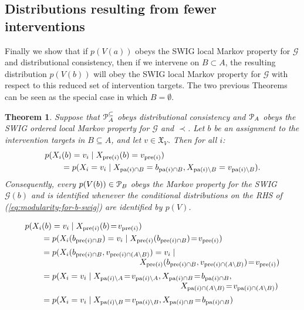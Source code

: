 \documentclass[11pt]{article}
\DeclareMathOperator{\pa}{pa}
\DeclareMathOperator{\pre}{pre}
\newtheorem{theorem}{Theorem}
\newcommand{\G}{{\mathscr G}}
\begin{document}
{\subsection{Distributions resulting from fewer interventions}

Finally we show that if $p(V(a))$ obeys the SWIG local Markov property for $\G$ and distributional consistency, then
if we intervene on $B \subset A$, the resulting distribution $p(V(b))$ will obey the SWIG local Markov property for $\G$ with respect to this reduced set of intervention targets. The two previous Theorems can be seen as the special case in which $B=\emptyset$.

\begin{theorem}\label{thm:swig-gb}
Suppose that ${\cal P}^{\subseteq}_A$ obeys distributional consistency and ${\cal P}_A$  obeys the 
SWIG ordered local Markov property for $\G$  and $\prec$.
Let ${b}$ be an assignment to the intervention targets in $B\subseteq A$, and let $v\in \mathfrak{X}_V$. Then for all $i$:
\begin{align}
\MoveEqLeft{p(X_i({ b}) =v_i \mid X_{\pre(i)}({b}) = v_{\pre(i)}) %
}
\nonumber\\
&= p(X_i=v_i \mid X_{\pa(i)\cap B}=b_{\pa(i)\cap B}, X_{\pa(i) \setminus B} = v_{\pa(i) \setminus B}).\label{eq:modularity-for-b-swig}
\end{align}
Consequently, every $p(V({b})) \in {\cal P}_B$ 
obeys the Markov property for the SWIG $\G({b})$ and is identified whenever the conditional distributions on the RHS of 
{\rm (\ref{eq:modularity-for-b-swig})}
are identified by $p(V)$.
\end{theorem}


\begin{align}
\MoveEqLeft{p(X_i({ b}) =v_i \mid X_{\pre(i)}({ b})\!=\! v_{\pre(i)}) }\nonumber\\
&= p(X_i({ b_{\pre(i)\cap B}}) =v_i \mid X_{\pre(i)}({b_{\pre(i)\cap B}})\!=\! v_{\pre(i)}) \nonumber\\[2pt]
&= p(X_i({ b_{\pre(i)\cap B}}, v_{\pre(i)\cap (A\setminus B)}) =v_i \mid\nonumber \\[-3pt]
&\kern120pt X_{\pre(i)}({b_{\pre(i)\cap B}}, v_{\pre(i)\cap (A\setminus B)})\!=\! v_{\pre(i)}) \nonumber\\[2pt]
&= p(X_i =v_i \mid X_{\pa(i)\setminus A}\!=\! v_{\pa(i)\setminus A},
X_{\pa(i)\cap B}\!=\! b_{\pa(i)\cap B},\nonumber\\[-3pt]
&\kern170pt X_{\pa(i)\cap ( A\setminus B) }\!=\! v_{\pa(i)\cap (A\setminus B)}) \nonumber\\[2pt]
&= p(X_i =v_i \mid X_{\pa(i)\setminus B}\!=\! v_{\pa(i)\setminus B},
X_{\pa(i)\cap B}\!=\! b_{\pa(i)\cap B}) \nonumber
\end{align}

}
\end{document}
